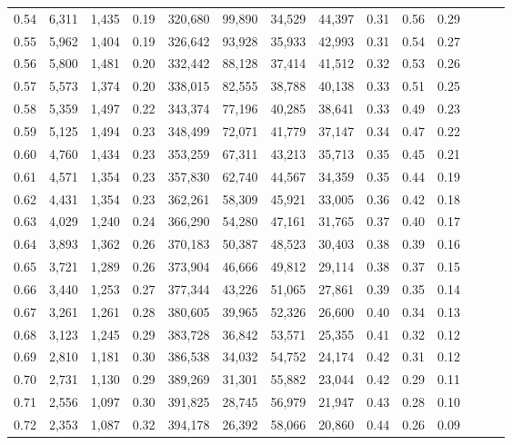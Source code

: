 \begin{tabular}{rrrrrrrrrrrrrr}
0.54 &  6,311 &  1,435 &  0.19 &  320,680 &   99,890 &  34,529 &  44,397 &  0.31 &  0.56 &      0.29 \\
0.55 &  5,962 &  1,404 &  0.19 &  326,642 &   93,928 &  35,933 &  42,993 &  0.31 &  0.54 &      0.27 \\
0.56 &  5,800 &  1,481 &  0.20 &  332,442 &   88,128 &  37,414 &  41,512 &  0.32 &  0.53 &      0.26 \\
0.57 &  5,573 &  1,374 &  0.20 &  338,015 &   82,555 &  38,788 &  40,138 &  0.33 &  0.51 &      0.25 \\
0.58 &  5,359 &  1,497 &  0.22 &  343,374 &   77,196 &  40,285 &  38,641 &  0.33 &  0.49 &      0.23 \\
0.59 &  5,125 &  1,494 &  0.23 &  348,499 &   72,071 &  41,779 &  37,147 &  0.34 &  0.47 &      0.22 \\
0.60 &  4,760 &  1,434 &  0.23 &  353,259 &   67,311 &  43,213 &  35,713 &  0.35 &  0.45 &      0.21 \\
0.61 &  4,571 &  1,354 &  0.23 &  357,830 &   62,740 &  44,567 &  34,359 &  0.35 &  0.44 &      0.19 \\
0.62 &  4,431 &  1,354 &  0.23 &  362,261 &   58,309 &  45,921 &  33,005 &  0.36 &  0.42 &      0.18 \\
0.63 &  4,029 &  1,240 &  0.24 &  366,290 &   54,280 &  47,161 &  31,765 &  0.37 &  0.40 &      0.17 \\
0.64 &  3,893 &  1,362 &  0.26 &  370,183 &   50,387 &  48,523 &  30,403 &  0.38 &  0.39 &      0.16 \\
0.65 &  3,721 &  1,289 &  0.26 &  373,904 &   46,666 &  49,812 &  29,114 &  0.38 &  0.37 &      0.15 \\
0.66 &  3,440 &  1,253 &  0.27 &  377,344 &   43,226 &  51,065 &  27,861 &  0.39 &  0.35 &      0.14 \\
0.67 &  3,261 &  1,261 &  0.28 &  380,605 &   39,965 &  52,326 &  26,600 &  0.40 &  0.34 &      0.13 \\
0.68 &  3,123 &  1,245 &  0.29 &  383,728 &   36,842 &  53,571 &  25,355 &  0.41 &  0.32 &      0.12 \\
0.69 &  2,810 &  1,181 &  0.30 &  386,538 &   34,032 &  54,752 &  24,174 &  0.42 &  0.31 &      0.12 \\
0.70 &  2,731 &  1,130 &  0.29 &  389,269 &   31,301 &  55,882 &  23,044 &  0.42 &  0.29 &      0.11 \\
0.71 &  2,556 &  1,097 &  0.30 &  391,825 &   28,745 &  56,979 &  21,947 &  0.43 &  0.28 &      0.10 \\
0.72 &  2,353 &  1,087 &  0.32 &  394,178 &   26,392 &  58,066 &  20,860 &  0.44 &  0.26 &      0.09 \\

\end{tabular}
